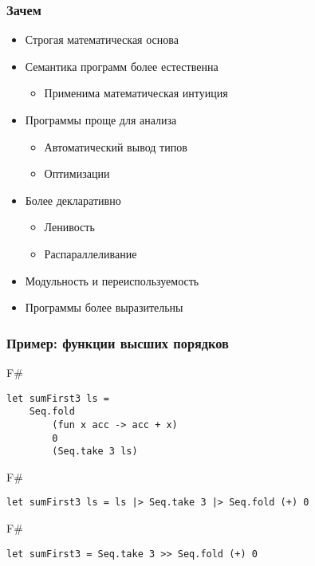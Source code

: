 \documentclass[xetex,mathserif,serif]{beamer}
\begin{document}
	\begin{frame}
		\frametitle{Зачем}
		\begin{itemize}
			\item Строгая математическая основа
			\item Семантика программ более естественна
			\begin{itemize}
				\item Применима математическая интуиция
			\end{itemize}
			\item Программы проще для анализа
			\begin{itemize}
				\item Автоматический вывод типов
				\item Оптимизации
			\end{itemize}
			\item Более декларативно
			\begin{itemize}
				\item Ленивость
				\item Распараллеливание
			\end{itemize}
			\item Модульность и переиспользуемость
			\item Программы более выразительны
		\end{itemize}
	\end{frame}
	
	\begin{frame}[fragile]
		\frametitle{Пример: функции высших порядков}
		\begin{exampleblock}{F\#}
			\begin{verbatim}
let sumFirst3 ls = 
    Seq.fold 
        (fun x acc -> acc + x) 
        0 
        (Seq.take 3 ls)
            \end{verbatim}
		\end{exampleblock}
		\begin{exampleblock}{F\#}
			\begin{verbatim}
let sumFirst3 ls = ls |> Seq.take 3 |> Seq.fold (+) 0
            \end{verbatim}
		\end{exampleblock}
		\begin{exampleblock}{F\#}
			\begin{verbatim}
let sumFirst3 = Seq.take 3 >> Seq.fold (+) 0
            \end{verbatim}
		\end{exampleblock}
\end{frame}
\end{document}

